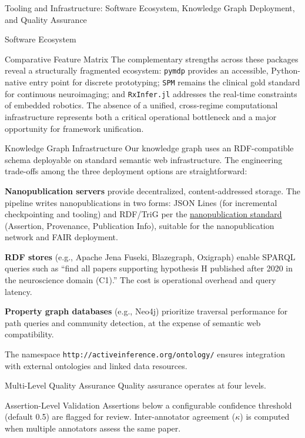 \documentclass[
  ignorenonframetext,
]{beamer}
\begin{document}
\begin{frame}[fragile]{Tooling and Infrastructure: Software Ecosystem,
Knowledge Graph Deployment, and Quality Assurance \label{sec:tooling}}
\begin{block}{Software Ecosystem}
\begin{block}{Comparative Feature Matrix}
The complementary strengths across these packages reveal a structurally
fragmented ecosystem: \texttt{pymdp} provides an accessible,
Python-native entry point for discrete prototyping; \texttt{SPM} remains
the clinical gold standard for continuous neuroimaging; and
\texttt{RxInfer.jl} addresses the real-time constraints of embedded
robotics. The absence of a unified, cross-regime computational
infrastructure represents both a critical operational bottleneck and a
major opportunity for framework unification.
\end{block}
\end{block}

\begin{block}{Knowledge Graph Infrastructure}
\protect{}\label{knowledge-graph-infrastructure}
Our knowledge graph uses an RDF-compatible schema deployable on standard
semantic web infrastructure. The engineering trade-offs among the three
deployment options are straightforward:

\textbf{Nanopublication servers} provide decentralized,
content-addressed storage. The pipeline writes nanopublications in two
forms: JSON Lines (for incremental checkpointing and tooling) and
RDF/TriG per the \href{https://nanopub.net/}{nanopublication standard}
(Assertion, Provenance, Publication Info), suitable for the
nanopublication network and FAIR deployment.

\textbf{RDF stores} (e.g., Apache Jena Fuseki, Blazegraph, Oxigraph)
enable SPARQL queries such as ``find all papers supporting hypothesis H
published after 2020 in the neuroscience domain (C1).'' The cost is
operational overhead and query latency.

\textbf{Property graph databases} (e.g., Neo4j) prioritize traversal
performance for path queries and community detection, at the expense of
semantic web compatibility.

The namespace \texttt{http://activeinference.org/ontology/} ensures
integration with external ontologies and linked data resources.
\end{block}

\begin{block}{Multi-Level Quality Assurance}
\protect{}\label{multi-level-quality-assurance}
Quality assurance operates at four levels.

\begin{block}{Assertion-Level Validation}
\protect{}\label{assertion-level-validation}
Assertions below a configurable confidence threshold (default 0.5) are
flagged for review. Inter-annotator agreement (\(\kappa\)) is computed
when multiple annotators assess the same paper.
\end{block}


\end{block}
\end{frame}
\end{document}
